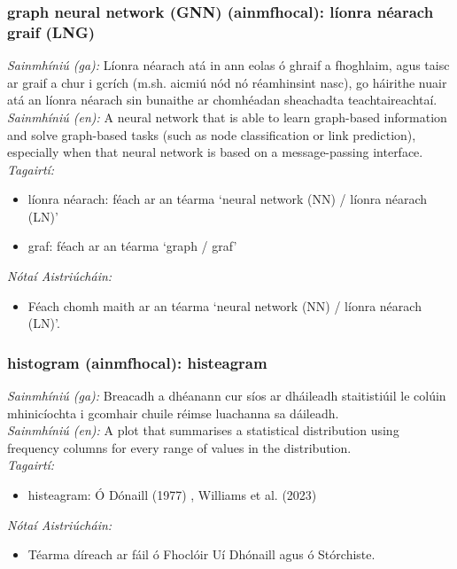 \subsubsection*{graph neural network (GNN) (ainmfhocal): líonra néarach graif (LNG)}
 \noindent \textit{Sainmhíniú (ga):} Líonra néarach atá in ann eolas ó ghraif a fhoghlaim, agus taisc ar graif a chur i gcrích (m.sh. aicmiú nód nó réamhinsint nasc), go háirithe nuair atá an líonra néarach sin bunaithe ar chomhéadan sheachadta teachtaireachtaí.
\\
 \noindent \textit{Sainmhíniú (en):} A neural network that is able to learn graph-based information and solve graph-based tasks (such as node classification or link prediction), especially when that neural network is based on a message-passing interface.
\\
 \noindent \textit{Tagairtí:}
\begin{itemize}
	\item líonra néarach: féach ar an téarma `neural network (NN) / líonra néarach (LN)'
	\item graf: féach ar an téarma `graph / graf'
\end{itemize}

 \noindent \textit{Nótaí Aistriúcháin:}
\begin{itemize}
	\item Féach chomh maith ar an téarma `neural network (NN) / líonra néarach (LN)'.
\end{itemize}


\subsubsection*{histogram (ainmfhocal): histeagram}
 \noindent \textit{Sainmhíniú (ga):} Breacadh a dhéanann cur síos ar dháileadh staitistiúil le colúin mhinicíochta i gcomhair chuile réimse luachanna sa dáileadh.
\\
 \noindent \textit{Sainmhíniú (en):} A plot that summarises a statistical distribution using frequency columns for every range of values in the distribution.
\\
 \noindent \textit{Tagairtí:}
\begin{itemize}
	\item histeagram: Ó Dónaill (1977) \cite{odonaill}, Williams et al. (2023) \cite{storchiste}
\end{itemize}

 \noindent \textit{Nótaí Aistriúcháin:}
\begin{itemize}
	\item Téarma díreach ar fáil ó Fhoclóir Uí Dhónaill agus ó Stórchiste.
\end{itemize}


